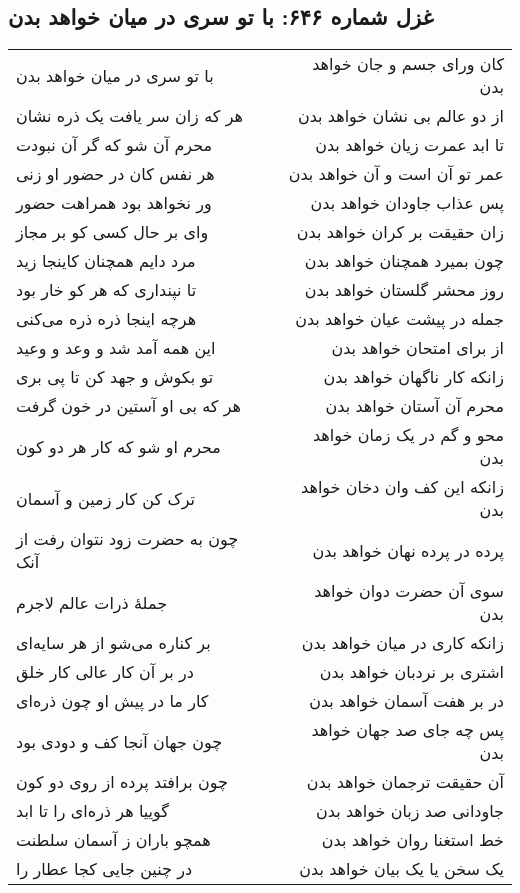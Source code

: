 \begin{center}
\section*{غزل شماره ۶۴۶: با تو سری در میان خواهد بدن}
\label{sec:646}
\begin{longtable}{l p{0.5cm} r}
با تو سری در میان خواهد بدن
&&
کان ورای جسم و جان خواهد بدن
\\
هر که زان سر یافت یک ذره نشان
&&
از دو عالم بی نشان خواهد بدن
\\
محرم آن شو که گر آن نبودت
&&
تا ابد عمرت زیان خواهد بدن
\\
هر نفس کان در حضور او زنی
&&
عمر تو آن است و آن خواهد بدن
\\
ور نخواهد بود همراهت حضور
&&
پس عذاب جاودان خواهد بدن
\\
وای بر حال کسی کو بر مجاز
&&
زان حقیقت بر کران خواهد بدن
\\
مرد دایم همچنان کاینجا زید
&&
چون بمیرد همچنان خواهد بدن
\\
تا نپنداری که هر کو خار بود
&&
روز محشر گلستان خواهد بدن
\\
هرچه اینجا ذره ذره می‌کنی
&&
جمله در پیشت عیان خواهد بدن
\\
این همه آمد شد و وعد و وعید
&&
از برای امتحان خواهد بدن
\\
تو بکوش و جهد کن تا پی بری
&&
زانکه کار ناگهان خواهد بدن
\\
هر که بی او آستین در خون گرفت
&&
محرم آن آستان خواهد بدن
\\
محرم او شو که کار هر دو کون
&&
محو و گم در یک زمان خواهد بدن
\\
ترک کن کار زمین و آسمان
&&
زانکه این کف وان دخان خواهد بدن
\\
چون به حضرت زود نتوان رفت از آنک
&&
پرده در پرده نهان خواهد بدن
\\
جملهٔ ذرات عالم لاجرم
&&
سوی آن حضرت دوان خواهد بدن
\\
بر کناره می‌شو از هر سایه‌ای
&&
زانکه کاری در میان خواهد بدن
\\
در بر آن کار عالی کار خلق
&&
اشتری بر نردبان خواهد بدن
\\
کار ما در پیش او چون ذره‌ای
&&
در بر هفت آسمان خواهد بدن
\\
چون جهان آنجا کف و دودی بود
&&
پس چه جای صد جهان خواهد بدن
\\
چون برافتد پرده از روی دو کون
&&
آن حقیقت ترجمان خواهد بدن
\\
گوییا هر ذره‌ای را تا ابد
&&
جاودانی صد زبان خواهد بدن
\\
همچو باران ز آسمان سلطنت
&&
خط استغنا روان خواهد بدن
\\
در چنین جایی کجا عطار را
&&
یک سخن یا یک بیان خواهد بدن
\\
\end{longtable}
\end{center}
